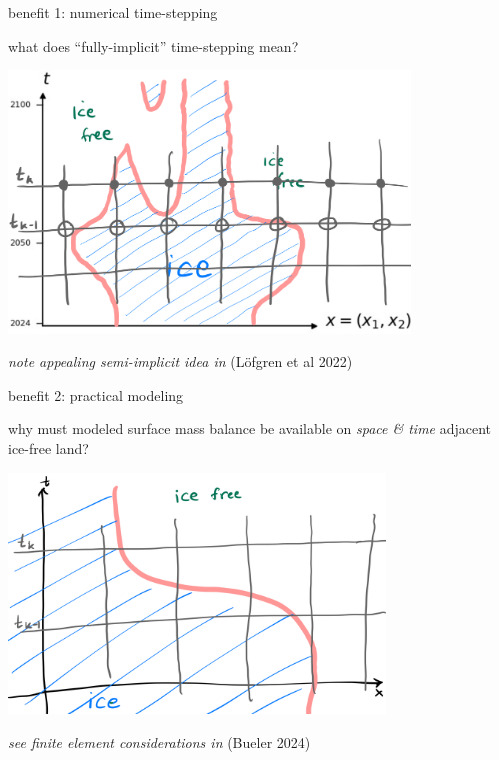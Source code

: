 \documentclass[10pt,dvipsnames]{beamer}
\begin{document}
\begin{frame}{benefit 1: numerical time-stepping}

what does ``fully-implicit'' time-stepping mean?

\medskip

\begin{center}
\includegraphics[width=0.8\textwidth]{implicitstep}
\end{center}

\medskip
{}

{\footnotesize \emph{note appealing semi-implicit idea in} (L\"ofgren et al 2022)}
\end{frame}


\begin{frame}{benefit 2: practical modeling}

why must modeled surface mass balance be available on \emph{space \& time} adjacent ice-free land?

\bigskip

\begin{center}
\includegraphics[width=0.75\textwidth]{smbcells}
\end{center}

\bigskip
{\footnotesize \emph{see finite element considerations in} (Bueler 2024)}
\end{frame}
\end{document}

